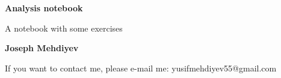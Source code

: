 \begin{titlepage}
    \begin{center}
        \vspace*{1cm}
        \Huge
        \textbf{Analysis notebook}
        
        \vspace*{0.5cm}
        \LARGE
        A notebook with some exercises
        \vspace*{1.5cm}

        \textbf{Joseph Mehdiyev}

        \vfill
        
        \small
        If you want to contact me, please e-mail me: yusifmehdiyev55@gmail.com
    \end{center}
\end{titlepage}
